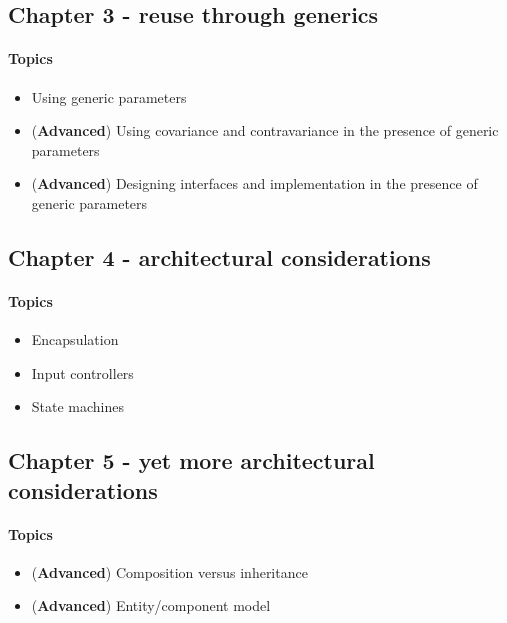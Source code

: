 \subsection{Chapter 3 - reuse through generics}
\paragraph*{Topics}			
\begin{itemize}
	\item Using generic parameters
	\item (\textbf{Advanced}) Using covariance and contravariance in the presence of generic parameters
	\item (\textbf{Advanced}) Designing interfaces and implementation in the presence of generic parameters
\end{itemize}



\subsection{Chapter 4 - architectural considerations}
\paragraph*{Topics}			
\begin{itemize}
	\item Encapsulation
	\item Input controllers
	\item State machines
\end{itemize}

\subsection{Chapter 5 - yet more architectural considerations}
\paragraph*{Topics}			
\begin{itemize}
	\item (\textbf{Advanced}) Composition versus inheritance
	\item (\textbf{Advanced}) Entity/component model
\end{itemize}
